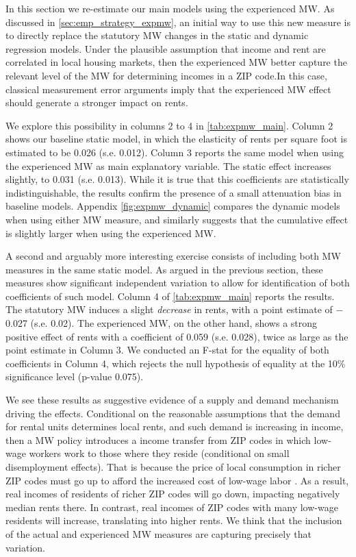 In this section we re-estimate our main models using the experienced MW. As discussed in 
\autoref{sec:emp_strategy_expmw}, an initial way to use this new measure is to directly
replace the statutory MW changes in the static and dynamic regression models. 
Under the plausible assumption that income and rent are correlated in local 
housing markets, then the experienced MW better capture the relevant level of the 
MW for determining incomes in a ZIP code.In this case, classical measurement error 
arguments imply that the experienced MW effect should generate a stronger impact on rents. 

We explore this possibility in columns 2 to 4 in \autoref{tab:expmw_main}. Column 2 
shows our baseline static model, in which the elasticity of rents per square foot is 
estimated to be 0.026 (s.e. 0.012). Column 3 reports the same model when using the 
experienced MW as main explanatory variable. The static effect increases slightly, to 0.031 (s.e. 0.013).
While it is true that this coefficients are statistically indistinguishable, the results
confirm the presence of a small attenuation bias in baseline models. 
Appendix \autoref{fig:expmw_dynamic} compares the dynamic models when using either MW 
measure, and similarly suggests that the cumulative effect is slightly larger when using
the experienced MW.

A second and arguably more interesting exercise consists of including both MW measures in
the same static model. As argued in the previous section, these measures show significant
independent variation to allow for identification of both coefficients of such model. 
Column 4 of \autoref{tab:expmw_main} reports the results. The statutory MW induces
a slight \textit{decrease} in rents, with a point estimate of $-$0.027 (s.e. 0.02). The 
experienced MW, on the other hand, shows a strong positive effect of rents with a 
coefficient of 0.059 (s.e. 0.028), twice as large as the point estimate in Column 3. We
conducted an F-stat for the equality of both coefficients in Column 4, which rejects the
null hypothesis of equality at the 10\% significance level (p-value 0.075). 

We see these results as suggestive evidence of a supply and demand mechanism driving the 
effects. Conditional on the reasonable assumptions that the demand for rental units determines 
local rents, and such demand is increasing in income, then a MW policy introduces a income transfer 
from ZIP codes in which low-wage workers work to those where they reside (conditional on 
small disemployment effects). That is because the price of local consumption in richer ZIP codes must go up 
to afford the increased cost of low-wage labor \parencite{allegretto2018local}. 
As a result, real incomes of residents of richer ZIP codes will go down, impacting negatively median 
rents there. In contrast, real incomes
of ZIP codes with many low-wage residents will increase, translating into higher rents. 
We think that the inclusion of the actual and experienced MW measures are capturing precisely
that variation.


